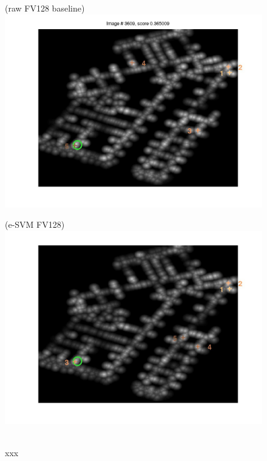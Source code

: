 \documentclass[10pt,onecolumn,A4]{article}
\begin{document}
\begin{figure}
	\begin{minipage}{0.45\linewidth}
		\center
		(raw FV128 baseline) \\
		\includegraphics[trim = 55mm 40mm 55mm 25mm, clip=true,width=\linewidth]{sup1957/heatRaw.jpg}
	\end{minipage} 
	\begin{minipage}{0.45\linewidth}
		\center
		(e-SVM FV128) \\
		\includegraphics[trim = 55mm 40mm 55mm 25mm, clip=true,width=\linewidth]{sup1957/heatSvm.jpg}
	\end{minipage} 
	\\
	\textcolor{myWhite}{xxx}\\

\end{figure}
\end{document}
